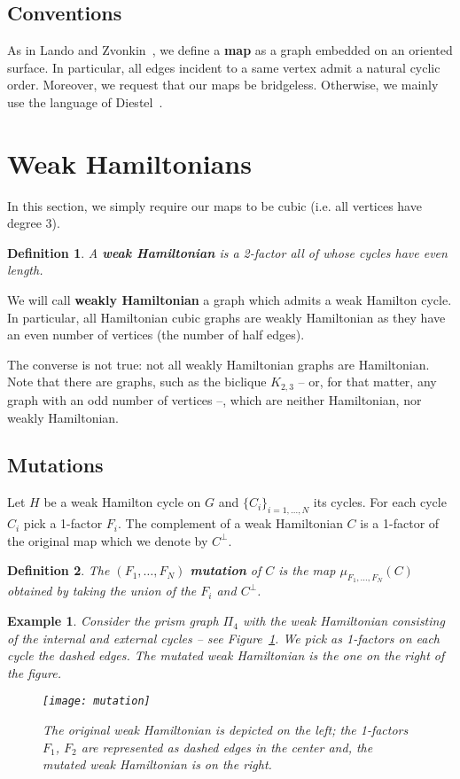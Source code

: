\documentclass[11pt]{amsart}
\newtheorem{defi}{Definition}[section]
\newtheorem{ex}{Example}[section]
\begin{document}
\subsection{Conventions}

As in Lando and Zvonkin~\cite{LZ}, we define a {\bf map} as a graph embedded on an oriented surface. 
In particular, all edges incident to a same vertex admit a natural cyclic order. 
Moreover, we request that our maps be bridgeless.
Otherwise, we mainly use the language of Diestel~\cite{Die}.

\section{Weak Hamiltonians}

In this section, we simply require our maps to be cubic (i.e. all vertices have degree $3$).

\begin{defi}
A {\bf weak Hamiltonian} is a 2-factor all of whose cycles have even length.
\end{defi}

We will call {\bf weakly Hamiltonian} a graph which admits a weak Hamilton cycle. 
In particular, all Hamiltonian cubic graphs are weakly Hamiltonian as they have an even number of vertices (the number of half edges).

The converse is not true: not all weakly Hamiltonian graphs are Hamiltonian. 
Note that there are graphs, such as the biclique $K_{2,3}$ -- or, for that matter, any graph with an odd number of vertices --, which are neither Hamiltonian, nor weakly Hamiltonian. 

\subsection{Mutations}

Let $H$ be a weak Hamilton cycle on $G$ and $\{C_{i}\}_{i=1,\ldots,N}$ its cycles. 
For each cycle $C_{i}$ pick a 1-factor $F_{i}$. 
The complement of a weak Hamiltonian $C$ is a 1-factor of the original map which we denote by $C^{\perp}$.

\begin{defi}
The $(F_{1},\ldots,F_{N})$ {\bf mutation} of $C$ is the map $\mu_{F_{1},\ldots,F_{N}}(C)$ obtained by taking the union of the $F_{i}$ and $C^{\perp}$.
\end{defi}

\begin{ex}
Consider the prism graph $\Pi_4$ with the weak Hamiltonian consisting of the internal and external cycles -- see Figure~\ref{fig:wham}. 
We pick as 1-factors on each cycle the dashed edges.
The mutated weak Hamiltonian is the one on the right of the figure.
\begin{figure}[!h]
{\texttt{[image: mutation]}}
\caption{The original weak Hamiltonian is depicted on the left; the 1-factors $F_{1}$, $F_{2}$ are represented as dashed edges in the center and, the mutated weak Hamiltonian is on the right.}
\label{fig:wham}
\end{figure}

\end{ex}
\end{document}
